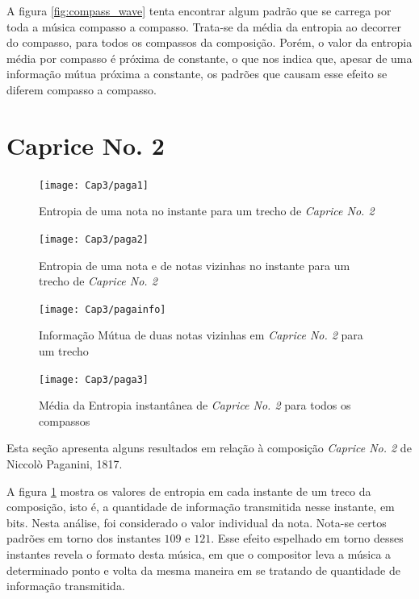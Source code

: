 A figura \ref{fig:compass_wave} tenta encontrar algum padrão que se carrega por toda a música compasso a compasso. Trata-se da média da entropia ao decorrer do compasso, para todos os compassos da composição. Porém, o valor da entropia média por compasso é próxima de constante, o que nos indica que, apesar de uma informação mútua próxima a constante, os padrões que causam esse efeito se diferem compasso a compasso.

\section{Caprice No. 2}

\begin{figure}[h]
\centering
\texttt{[image: Cap3/paga1]}
\caption{Entropia de uma nota no instante para um trecho de \textit{Caprice No. 2}}
\label{fig:paga1}
\end{figure}

\begin{figure}[h]
\centering
\texttt{[image: Cap3/paga2]}
\caption{Entropia de uma nota e de notas vizinhas no instante para um trecho de \textit{Caprice No. 2}}
\label{fig:paga2}
\end{figure}

\begin{figure}[h]
\centering
\texttt{[image: Cap3/pagainfo]}
\caption{Informação Mútua de duas notas vizinhas em \textit{Caprice No. 2} para um trecho}
\label{fig:pagainfo}
\end{figure}

\begin{figure}[h]
\centering
\texttt{[image: Cap3/paga3]}
\caption{Média da Entropia instantânea de \textit{Caprice No. 2} para todos os compassos}
\label{fig:paga3}
\end{figure}

Esta seção apresenta alguns resultados em relação à composição \textit{Caprice No. 2} de Niccolò Paganini, 1817. \cite{caprice2}

A figura \ref{fig:paga1} mostra os valores de entropia em cada instante de um treco da composição, isto é, a quantidade de informação transmitida nesse instante, em bits. Nesta análise, foi considerado o valor individual da nota. Nota-se certos padrões em torno dos instantes $109$ e $121$. Esse efeito espelhado em torno desses instantes revela o formato desta música, em que o compositor leva a música a determinado ponto e volta da mesma maneira em se tratando de quantidade de informação transmitida.

